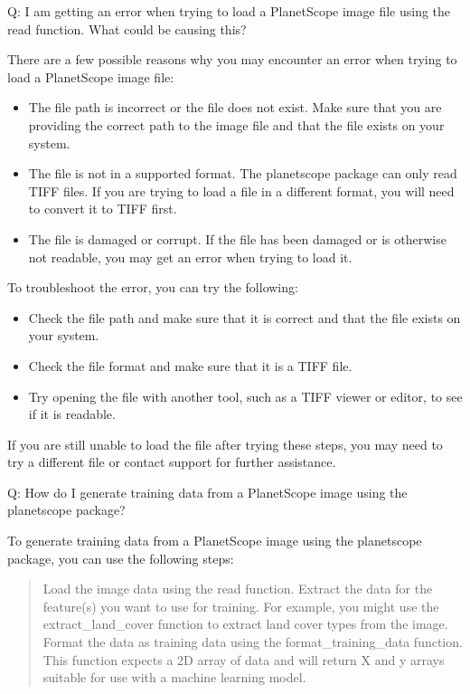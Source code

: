 \documentclass[letterpaper,10pt,english]{sphinxmanual}
\begin{document}
\sphinxAtStartPar
Q: I am getting an error when trying to load a PlanetScope image file using the read function. What could be causing this?

\sphinxAtStartPar
There are a few possible reasons why you may encounter an error when trying to load a PlanetScope image file:
\begin{itemize}
\item {} 
\sphinxAtStartPar
The file path is incorrect or the file does not exist. Make sure that you are providing the correct path to the image file and that the file exists on your system.

\item {} 
\sphinxAtStartPar
The file is not in a supported format. The planetscope package can only read TIFF files. If you are trying to load a file in a different format, you will need to convert it to TIFF first.

\item {} 
\sphinxAtStartPar
The file is damaged or corrupt. If the file has been damaged or is otherwise not readable, you may get an error when trying to load it.

\end{itemize}

\sphinxAtStartPar
To troubleshoot the error, you can try the following:
\begin{itemize}
\item {} 
\sphinxAtStartPar
Check the file path and make sure that it is correct and that the file exists on your system.

\item {} 
\sphinxAtStartPar
Check the file format and make sure that it is a TIFF file.

\item {} 
\sphinxAtStartPar
Try opening the file with another tool, such as a TIFF viewer or editor, to see if it is readable.

\end{itemize}

\sphinxAtStartPar
If you are still unable to load the file after trying these steps, you may need to try a different file or contact support for further assistance.

\sphinxAtStartPar
Q: How do I generate training data from a PlanetScope image using the planetscope package?

\sphinxAtStartPar
To generate training data from a PlanetScope image using the planetscope package, you can use the following steps:
\begin{quote}

\sphinxAtStartPar
Load the image data using the read function.
Extract the data for the feature(s) you want to use for training. For example, you might use the extract\_land\_cover function to extract land cover types from the image.
Format the data as training data using the format\_training\_data function. This function expects a 2D array of data and will return X and y arrays suitable for use with a machine learning model.
\end{quote}
\end{document}
